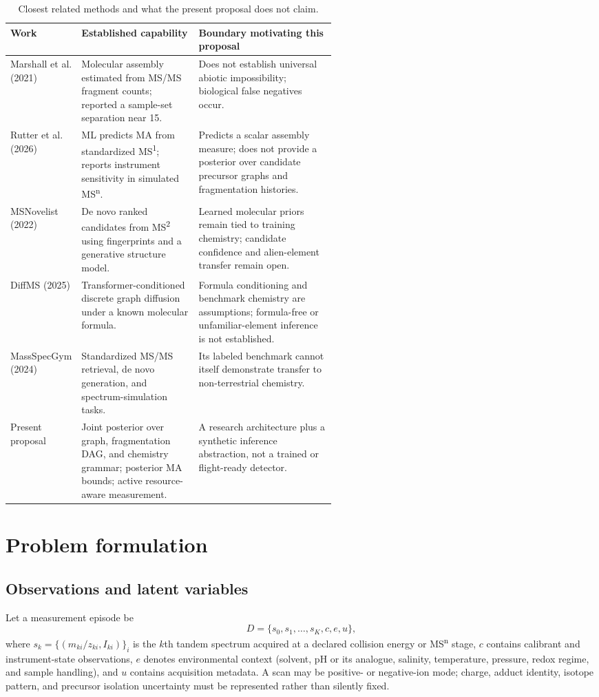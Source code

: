 \documentclass[10pt,a4paper]{article}
\begin{document}
\begin{table}[H]
\centering\small
\caption{Closest related methods and what the present proposal does not claim.}
\label{tab:related}
\begin{tabularx}{\linewidth}{p{0.19\linewidth}p{0.36\linewidth}X}
\toprule
Work & Established capability & Boundary motivating this proposal \\
\midrule
Marshall et al. (2021) & Molecular assembly estimated from MS/MS fragment counts; reported a sample-set separation near 15. & Does not establish universal abiotic impossibility; biological false negatives occur. \\
Rutter et al. (2026) & ML predicts MA from standardized MS\textsuperscript{1}; reports instrument sensitivity in simulated MS\textsuperscript{n}. & Predicts a scalar assembly measure; does not provide a posterior over candidate precursor graphs and fragmentation histories. \\
MSNovelist (2022) & De novo ranked candidates from MS\textsuperscript{2} using fingerprints and a generative structure model. & Learned molecular priors remain tied to training chemistry; candidate confidence and alien-element transfer remain open. \\
DiffMS (2025) & Transformer-conditioned discrete graph diffusion under a known molecular formula. & Formula conditioning and benchmark chemistry are assumptions; formula-free or unfamiliar-element inference is not established. \\
MassSpecGym (2024) & Standardized MS/MS retrieval, de novo generation, and spectrum-simulation tasks. & Its labeled benchmark cannot itself demonstrate transfer to non-terrestrial chemistry. \\
Present proposal & Joint posterior over graph, fragmentation DAG, and chemistry grammar; posterior MA bounds; active resource-aware measurement. & A research architecture plus a synthetic inference abstraction, not a trained or flight-ready detector. \\
\bottomrule
\end{tabularx}
\end{table}

\section{Problem formulation}
\subsection{Observations and latent variables}
Let a measurement episode be
\[
D=\{s_0,s_1,\ldots,s_K,c,e,u\},
\]
where $s_k=\{(m_{ki}/z_{ki},I_{ki})\}_i$ is the $k$th tandem spectrum acquired at a declared collision energy or MS\textsuperscript{n} stage, $c$ contains calibrant and instrument-state observations, $e$ denotes environmental context (solvent, pH or its analogue, salinity, temperature, pressure, redox regime, and sample handling), and $u$ contains acquisition metadata. A scan may be positive- or negative-ion mode; charge, adduct identity, isotope pattern, and precursor isolation uncertainty must be represented rather than silently fixed.
\end{document}
